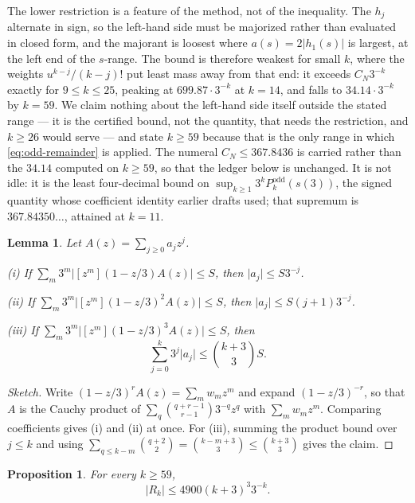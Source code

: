 \documentclass[11pt]{amsart}
\theoremstyle{plain}
\newtheorem{proposition}[theorem]{Proposition}
\newtheorem{lemma}[theorem]{Lemma}
\theoremstyle{definition}
\newcommand{\abs}[1]{\lvert #1\rvert}
\begin{document}
The lower restriction is a feature of the method, not of the inequality. The
$h_j$ alternate in sign, so the left-hand side must be majorized rather than
evaluated in closed form, and the majorant is loosest where
$a(s)=2\abs{h_1(s)}$ is largest, at the left end of the $s$-range. The bound
is therefore weakest for small $k$, where the weights $u^{k-j}/(k-j)!$ put
least mass away from that end: it exceeds $C_N3^{-k}$ exactly for
$9\leq k\leq25$, peaking at $699.87\cdot3^{-k}$ at $k=14$, and falls to
$34.14\cdot3^{-k}$ by $k=59$. We claim nothing about the left-hand side itself
outside the stated range --- it is the certified bound, not the quantity, that
needs the restriction, and $k\geq26$ would serve --- and state $k\geq59$
because that is the only range in which \eqref{eq:odd-remainder} is applied.
The numeral $C_N\leq367.8436$ is carried rather than the $34.14$ computed on
$k\geq59$, so that the ledger below is unchanged. It is not idle: it is the
least four-decimal bound on $\sup_{k\geq1}3^kP_k^{\mathrm{odd}}(s(3))$, the
signed quantity whose coefficient identity earlier drafts used; that supremum
is $367.84350\ldots$, attained at $k=11$.

\begin{lemma}\label{lem:pole-coefficient-bounds}
Let $A(z)=\sum_{j\geq0}a_jz^j$.

\noindent(i) If $\sum_m3^m\abs{[z^m](1-z/3)A(z)}\leq S$, then
$\abs{a_j}\leq S3^{-j}$.

\noindent(ii) If
$\sum_m3^m\abs{[z^m](1-z/3)^2A(z)}\leq S$, then
$\abs{a_j}\leq S(j+1)3^{-j}$.

\noindent(iii) If
$\sum_m3^m\abs{[z^m](1-z/3)^3A(z)}\leq S$, then
\begin{equation}\label{eq:second-derivative-sum}
  \sum_{j=0}^k3^j\abs{a_j}\leq\binom{k+3}{3}S.
\end{equation}
\end{lemma}

\begin{proof}[Sketch]
Write $(1-z/3)^rA(z)=\sum_mw_mz^m$ and expand $(1-z/3)^{-r}$, so that $A$ is
the Cauchy product of $\sum_q\binom{q+r-1}{r-1}3^{-q}z^q$ with $\sum_mw_mz^m$.
Comparing coefficients gives (i) and (ii) at once. For (iii), summing the
product bound over $j\leq k$ and using
$\sum_{q\leq k-m}\binom{q+2}{2}=\binom{k-m+3}{3}\leq\binom{k+3}{3}$ gives the
claim.
\end{proof}

\begin{proposition}\label{prop:odd-remainder}
For every $k\geq59$,
\begin{equation}\label{eq:odd-remainder}
  \abs{R_k}\leq4900(k+3)^3 3^{-k}.
\end{equation}
\end{proposition}
\end{document}
